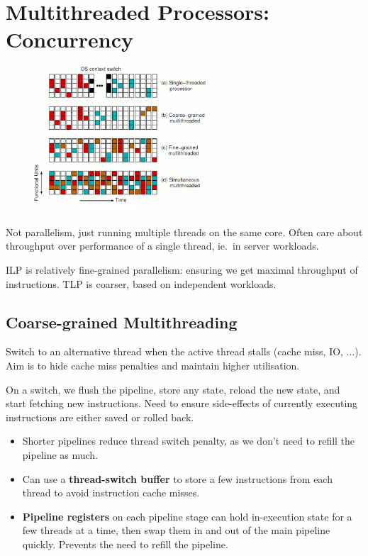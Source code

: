 \documentclass[11pt]{article}
\begin{document}
\section*{Multithreaded Processors: \textbf{Concurrency}}
{
    \begin{figure}
    \centering
    \includegraphics[width=0.57\textwidth]{multithreading-summary.png}
    \end{figure}
    
    Not parallelism, just running multiple threads on the same core. Often care about throughput over performance of a single thread, ie.\ in server workloads.

    ILP is relatively fine-grained parallelism: ensuring we get maximal throughput of instructions. TLP is coarser, based on independent workloads.

    \subsection*{Coarse-grained Multithreading}
    {
        Switch to an alternative thread when the active thread stalls (cache miss, IO, ...). Aim is to hide cache miss penalties and maintain higher utilisation.

        On a switch, we flush the pipeline, store any state, reload the new state, and start fetching new instructions. Need to ensure side-effects of currently executing instructions are either saved or rolled back.

        \begin{itemize}
        \item Shorter pipelines reduce thread switch penalty, as we don't need to refill the pipeline as much.
        \item Can use a \textbf{thread-switch buffer} to store a few instructions from each thread to avoid instruction cache misses. 
        \item \textbf{Pipeline registers} on each pipeline stage can hold in-execution state for a few threads at a time, then swap them in and out of the main pipeline quickly. Prevents the need to refill the pipeline.
        \end{itemize}
    }
}
\end{document}
